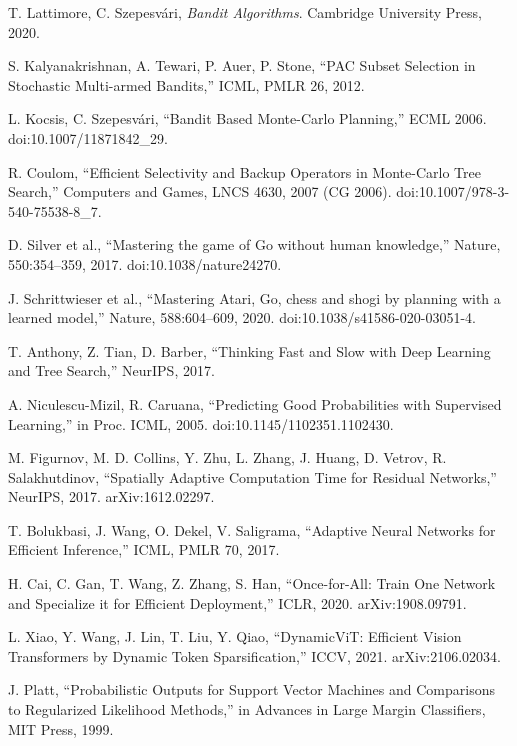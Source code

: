 \begin{thebibliography}{99}
T. Lattimore, C. Szepesvári, \emph{Bandit Algorithms}. Cambridge University Press, 2020.

S. Kalyanakrishnan, A. Tewari, P. Auer, P. Stone, ``PAC Subset Selection in Stochastic Multi-armed Bandits,'' ICML, PMLR 26, 2012.

L. Kocsis, C. Szepesvári, ``Bandit Based Monte-Carlo Planning,'' ECML 2006. doi:10.1007/11871842\_29.

R. Coulom, ``Efficient Selectivity and Backup Operators in Monte-Carlo Tree Search,'' Computers and Games, LNCS 4630, 2007 (CG 2006). doi:10.1007/978-3-540-75538-8\_7.

D. Silver et al., ``Mastering the game of Go without human knowledge,'' Nature, 550:354--359, 2017. doi:10.1038/nature24270.

J. Schrittwieser et al., ``Mastering Atari, Go, chess and shogi by planning with a learned model,'' Nature, 588:604--609, 2020. doi:10.1038/s41586-020-03051-4.

T. Anthony, Z. Tian, D. Barber, ``Thinking Fast and Slow with Deep Learning and Tree Search,'' NeurIPS, 2017.

A. Niculescu-Mizil, R. Caruana, ``Predicting Good Probabilities with Supervised Learning,'' in Proc. ICML, 2005. doi:10.1145/1102351.1102430.

M. Figurnov, M. D. Collins, Y. Zhu, L. Zhang, J. Huang, D. Vetrov, R. Salakhutdinov, ``Spatially Adaptive Computation Time for Residual Networks,'' NeurIPS, 2017. arXiv:1612.02297.

T. Bolukbasi, J. Wang, O. Dekel, V. Saligrama, ``Adaptive Neural Networks for Efficient Inference,'' ICML, PMLR 70, 2017.

H. Cai, C. Gan, T. Wang, Z. Zhang, S. Han, ``Once-for-All: Train One Network and Specialize it for Efficient Deployment,'' ICLR, 2020. arXiv:1908.09791.

L. Xiao, Y. Wang, J. Lin, T. Liu, Y. Qiao, ``DynamicViT: Efficient Vision Transformers by Dynamic Token Sparsification,'' ICCV, 2021. arXiv:2106.02034.

J. Platt, ``Probabilistic Outputs for Support Vector Machines and Comparisons to Regularized Likelihood Methods,'' in Advances in Large Margin Classifiers, MIT Press, 1999.


\end{thebibliography}
